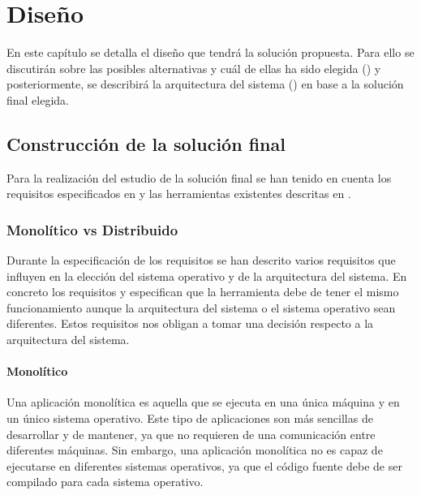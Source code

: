\chapter{Diseño}\label{chap:diseno}

En este capítulo se detalla el diseño que tendrá la solución propuesta. Para ello se discutirán sobre las posibles alternativas y cuál de ellas ha sido elegida () y posteriormente, se describirá la arquitectura del sistema () en base a la solución final elegida.

\section{Construcción de la solución final}\label{sec:estudio-solucion-final}

Para la realización del estudio de la solución final se han tenido en cuenta los requisitos especificados en  y las herramientas existentes descritas en . 

\subsection{Monolítico vs Distribuido} \label{subsec:monolitico-vs-distribuido}

Durante la especificación de los requisitos se han descrito varios requisitos que influyen en la elección del sistema operativo y de la arquitectura del sistema. En concreto los requisitos  y  especifican que la herramienta debe de tener el mismo funcionamiento aunque la arquitectura del sistema o el sistema operativo sean diferentes. Estos requisitos nos obligan a tomar una decisión respecto a la arquitectura del sistema. 

\subsubsection{Monolítico} \label{subsubsec:monolitico}

Una \gls{aplicación monolítica} \cite{DistributedSystems} es aquella que se ejecuta en una única máquina y en un único sistema operativo. Este tipo de aplicaciones son más sencillas de desarrollar y de mantener, ya que no requieren de una comunicación entre diferentes máquinas. Sin embargo, una \gls{aplicación monolítica} no es capaz de ejecutarse en diferentes sistemas operativos, ya que el código fuente debe de ser compilado para cada sistema operativo. 


